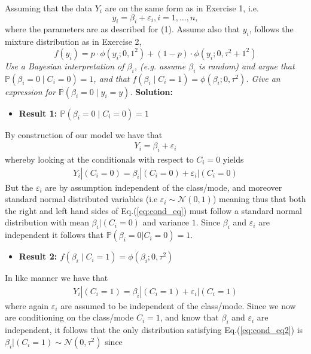 Assuming that the data $Y_i$ are on the same form as in Exercise 1, i.e.
$$
y_i=\beta_i+\varepsilon_i, i=1, \ldots, n,
$$
where the parameters are as described for (1). Assume also that $y_i$, follows the mixture distribution as in Exercise 2,
$$
f\left(y_i\right)=p \cdot \phi\left(y_i ; 0,1^2\right)+(1-p) \cdot \phi\left(y_i ; 0, \tau^2+1^2\right)
$$
\emph{Use a Bayesian interpretation of $\beta_i$, (e.g. assume $\beta_i$ is random) and argue that $\mathbb{P}\left(\beta_i=0 \mid C_i=0\right)=1$, and that $f\left(\beta_i \mid C_i=1\right)=\phi\left(\beta_i ; 0, \tau^2\right)$. Give an expression for $\mathbb{P}\left(\beta_i=0 \mid y_i=y\right)$.}  \spaze
\textbf{Solution:} \spaze
\begin{itemize}
    \item \textbf{Result 1: $\mathbb{P}\left(\beta_i=0 \mid C_i=0\right)=1$}
\end{itemize}
By construction of our model we have that 
\begin{align}
    Y_i = \beta_i + \varepsilon_i 
\end{align}
whereby looking at the conditionals with respect to $C_i = 0$ yields
\begin{align}
Y_i|(C_i = 0) = \beta_i|(C_i=0) + \varepsilon_i|(C_i=0) \label{eq:cond_eq}
\end{align}
But the $\varepsilon_i$ are by assumption independent of the class/mode, and moreover standard normal distributed variables (i.e $\varepsilon_i \sim \mathcal{N}(0,1)$) meaning thus that both the right and left hand sides of Eq.(\ref{eq:cond_eq}) must follow a standard normal distribution with mean $\beta_i|(C_i=0)$ and variance $1$. Since $\beta_i$ and $\varepsilon_i$ are independent it follows that $\mathbb{P}(\beta_i=0 | C_i =0) = 1$.
\begin{itemize}
    \item \textbf{Result 2: $f\left(\beta_i \mid C_i=1\right)=\phi\left(\beta_i ; 0, \tau^2\right)$} 
\end{itemize}
In like manner we have that 
\begin{align} 
    Y_i|(C_i = 1) = \beta_i|(C_i=1) + \varepsilon_i|(C_i=1)  \label{eq:cond_eq2}
\end{align}
where again $\varepsilon_i$ are assumed to be independent of the class/mode. Since we now are conditioning on the class/mode $C_i = 1$, and know that $\beta_i$ and $\varepsilon_i$ are independent, it follows that the only distribution satisfying Eq.(\ref{eq:cond_eq2}) is $\beta_i | (C_i = 1) \sim \mathcal{N}(0, \tau^2)$ since 

